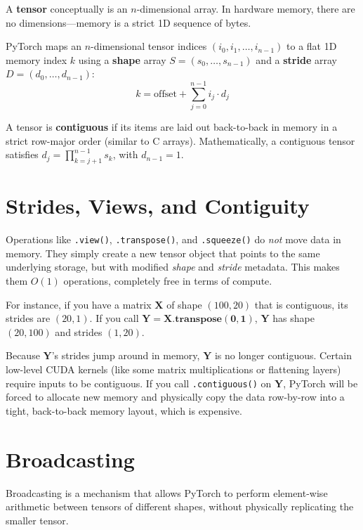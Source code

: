 A \textbf{tensor} conceptually is an $n$-dimensional array. In hardware memory, there are no dimensions---memory is a strict 1D sequence of bytes. 

PyTorch maps an $n$-dimensional tensor indices $(i_0, i_1, \ldots, i_{n-1})$ to a flat 1D memory index $k$ using a \textbf{shape} array $S = (s_0, \ldots, s_{n-1})$ and a \textbf{stride} array $D = (d_0, \ldots, d_{n-1})$:
\begin{equation}
k = \text{offset} + \sum_{j=0}^{n-1} i_j \cdot d_j
\end{equation}

A tensor is \textbf{contiguous} if its items are laid out back-to-back in memory in a strict row-major order (similar to C arrays). Mathematically, a contiguous tensor satisfies $d_j = \prod_{k=j+1}^{n-1} s_k$, with $d_{n-1} = 1$.

\section{Strides, Views, and Contiguity}
\label{ch:03:sec:main}

Operations like \texttt{.view()}, \texttt{.transpose()}, and \texttt{.squeeze()} do \emph{not} move data in memory. They simply create a new tensor object that points to the same underlying storage, but with modified \emph{shape} and \emph{stride} metadata. This makes them $O(1)$ operations, completely free in terms of compute.

For instance, if you have a matrix $\mathbf{X}$ of shape $(100, 20)$ that is contiguous, its strides are $(20, 1)$. If you call $\mathbf{Y} = \mathbf{X.transpose(0, 1)}$, $\mathbf{Y}$ has shape $(20, 100)$ and strides $(1, 20)$. 

Because $\mathbf{Y}$'s strides jump around in memory, $\mathbf{Y}$ is no longer contiguous. Certain low-level CUDA kernels (like some matrix multiplications or flattening layers) require inputs to be contiguous. If you call \texttt{.contiguous()} on $\mathbf{Y}$, PyTorch will be forced to allocate new memory and physically copy the data row-by-row into a tight, back-to-back memory layout, which is expensive.

\section{Broadcasting}
Broadcasting is a mechanism that allows PyTorch to perform element-wise arithmetic between tensors of different shapes, without physically replicating the smaller tensor.

